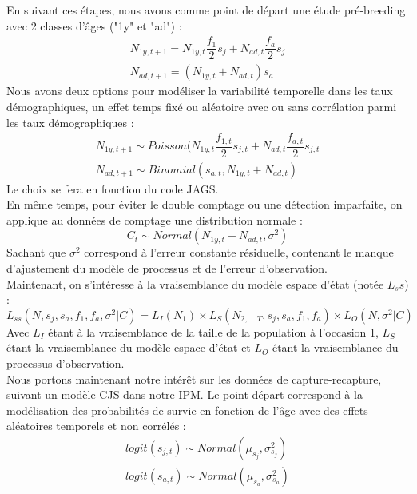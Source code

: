 \documentclass[12pt,a4paper]{article}
\begin{document}
En suivant ces étapes, nous avons comme point de départ une étude pré-breeding avec 2 classes d'âges ("1y" et "ad") :
\begin{equation}
\begin{aligned}
N_{1y, t+1}=N_{1y, t}\dfrac{f_1}{2}s_{j}+N_{ad, t}\dfrac{f_a}{2}s_{j}
\\
N_{ad, t+1}=(N_{1y, t}+N_{ad, t})s_{a}
\end{aligned}
\end{equation}
Nous avons deux options pour modéliser la variabilité temporelle dans les taux démographiques, un effet temps fixé ou aléatoire avec ou sans corrélation parmi les taux démographiques :
\begin{equation}
\begin{aligned}
N_{1y, t+1} \sim Poisson(N_{1y, t}\dfrac{f_{1,t}}{2}s_{j,t}+N_{ad, t}\dfrac{f_{a,t}}{2}s_{j,t}\\
N_{ad, t+1} \sim Binomial(s_{a,t},N_{1y, t}+N_{ad, t})
\end{aligned}
\end{equation}
Le choix se fera en fonction du code JAGS.
\\
En même temps, pour éviter le double comptage ou une détection imparfaite, on applique au données de comptage une distribution normale : 
\begin{equation}
C_{t} \sim Normal(N_{1y, t}+N_{ad, t},\sigma^{2})
\end{equation}
Sachant que $\sigma^{2}$ correspond à l'erreur constante résiduelle, contenant le manque d'ajustement du modèle de processus et de l'erreur d'observation.\\
Maintenant, on s'intéresse à la vraisemblance du modèle espace d'état (notée $L_ss$) :
\begin{equation}
L_{ss}(N, s_{j}, s_{a}, f_{1}, f_{a}, \sigma^{2}|C)= L_{I}(N_{1})\times L_{S}(N_{2,....T}, s_{j}, s_{a}, f_{1}, f_{a})\times L_{O}(N,\sigma^{2}|C)
\end{equation}
Avec $L_I$ étant à la vraisemblance de la taille de la population à l'occasion 1, $L_S$ étant la vraisemblance du modèle espace d'état et $L_O$ étant la vraisemblance du processus d'observation.\\
Nous portons maintenant notre intérêt sur les données de capture-recapture, suivant un modèle CJS dans notre IPM. Le point départ correspond à la modélisation des probabilités de survie en fonction de l'âge avec des effets aléatoires temporels et non corrélés : 
\begin{equation}
\begin{aligned}
logit(s_{j,t})\sim Normal(\mu_{s_j},\sigma^2_{s_j})
\\
logit(s_{a,t})\sim Normal(\mu_{s_a},\sigma^2_{s_a})
\end{aligned}
\end{equation}
\end{document}
